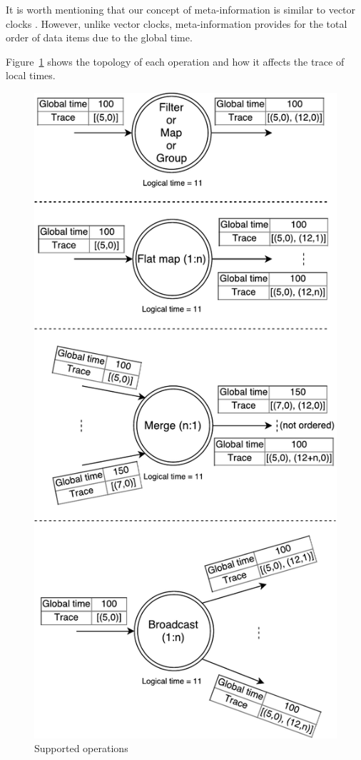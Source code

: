 It is worth mentioning that our concept of meta-information is similar to vector clocks
\cite{fidge1988timestamps, mattern88virtualtime}. However, unlike vector clocks, meta-information provides for the total order of data items due to the global time.

Figure~\ref{logical-graph-ops-figure} shows the topology of each operation and how it affects the trace of local times.

\begin{figure}[htbp]
  \centering
  \includegraphics[scale=0.5]{pics/operations}
  \caption{Supported operations}
  \label {logical-graph-ops-figure}
\end{figure}

